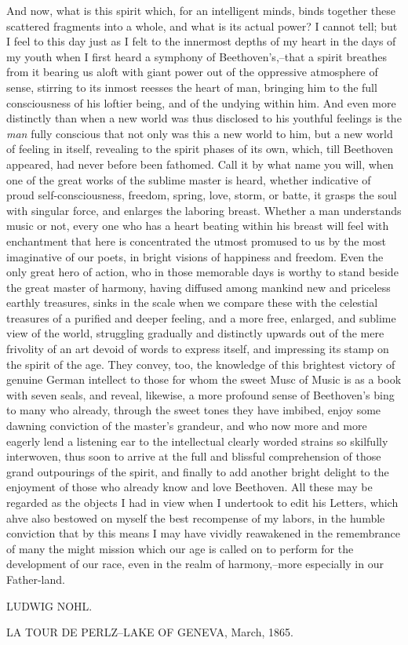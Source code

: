 \documentclass[12pt,oneside]{book}
\begin{document}
And now, what is this spirit which, for an intelligent minds, binds together these scattered fragments into a whole, and what is its actual power? I cannot tell; but I feel to this day just as I felt to the innermost depths of my heart in the days of my youth when I first heard a symphony of Beethoven's,--that a spirit breathes from it bearing us aloft with giant power out of the oppressive atmosphere of sense, stirring to its inmost reesses the heart of man, bringing him to the full consciousness of his loftier being, and of the undying within him. And even more distinctly than when a new world was thus disclosed to his youthful feelings is the \textit{man} fully conscious that not only was this a new world to him, but a new world of feeling in itself, revealing to the spirit phases of its own, which, till Beethoven appeared, had never before been fathomed. Call it by what name you will, when one of the great works of the sublime master is heard, whether indicative of proud self-consciousness, freedom, spring, love, storm, or batte, it grasps the soul with singular force, and enlarges the laboring breast. Whether a man understands music or not, every one who has a heart beating within his breast will feel with enchantment that here is concentrated the utmost promused to us by the most imaginative of our poets, in bright visions of happiness and freedom. Even the only great hero of action, who in those memorable days is worthy to stand beside the great master of harmony, having diffused among mankind new and priceless earthly treasures, sinks in the scale when we compare these with the celestial treasures of a purified and deeper feeling, and a more free, enlarged, and sublime view of the world, struggling gradually and distinctly upwards out of the mere frivolity of an art devoid of words to express itself, and impressing its stamp on the spirit of the age. They convey, too, the knowledge of this brightest victory of genuine German intellect to those for whom the sweet Musc of Music is as a book with seven seals, and reveal, likewise, a more profound sense of Beethoven's bing to many who already, through the sweet tones they have imbibed, enjoy some dawning conviction of the master's grandeur, and who now more and more eagerly lend a listening ear to the intellectual clearly worded strains so skilfully interwoven, thus soon to arrive at the full and blissful comprehension of those grand outpourings of the spirit, and finally to add another bright delight to the enjoyment of those who already know and love Beethoven. All these may be regarded as the objects I had in view when I undertook to edit his Letters, which ahve also bestowed on myself the best recompense of my labors, in the humble conviction that by this means I may have vividly reawakened in the remembrance of many the might mission which our age is called on to perform for the development of our race, even in the realm of harmony,--more especially in our Father-land. \par 
\begin{flushright}
    LUDWIG NOHL.
\end{flushright}
LA TOUR DE PERLZ--LAKE OF GENEVA, March, 1865.
\end{document}
